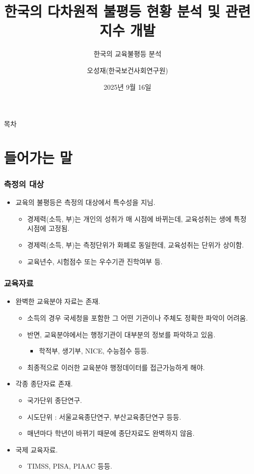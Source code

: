\documentclass[aspectratio=169,xcolor=dvipsnames,handout]{beamer}
\title{한국의 다차원적 불평등 현황 분석 및 관련 지수 개발}
\subtitle{한국의 교육불평등 분석}
\author{오성재(한국보건사회연구원)}
\institute[KIHASA]
    {%
        국회입법조사처
    }
\date{2025년 9월 16일}
\begin{document}

\frame{\titlepage}

\begin{frame}{목차}
    \setcounter{tocdepth}{1}
    \tableofcontents
\end{frame}

\section{들어가는 말}
\begin{frame}[<+->]
\frametitle{측정의 대상}
    \begin{itemize}
        \item 교육의 불평등은 측정의 대상에서 특수성을 지님.
        \begin{itemize}[<+->]
            \item 경제력(소득, 부)는 개인의 성취가 매 시점에 바뀌는데, 교육성취는 생에 특정시점에 고정됨.
            \item 경제력(소득, 부)는 측정단위가 화폐로 동일한데, 교육성취는 단위가 상이함.
            \item 교육년수, 시험점수 또는 우수기관 진학여부 등.
        \end{itemize}
    \end{itemize}
\end{frame}

\begin{frame}[<+->]
\frametitle{교육자료}
    \begin{itemize}
        \item 완벽한 교육분야 자료는 존재.
        \begin{itemize}[<+->]
            \item 소득의 경우 국세청을 포함한 그 어떤 기관이나 주체도 정확한 파악이 어려움.
            \item 반면, 교육분야에서는 행정기관이 대부분의 정보를 파악하고 있음.
                \begin{itemize}[<+->]
                    \item 학적부, 생기부, NICE, 수능점수 등등.
                \end{itemize}
            \item 최종적으로 이러한 교육분야 행정데이터를 접근가능하게 해야.
        \end{itemize}
        \item 각종 종단자료 존재.
        \begin{itemize}[<+->]
            \item 국가단위 종단연구.
            \item 시도단위 : 서울교육종단연구, 부산교육종단연구 등등.
            \item 매년마다 학년이 바뀌기 때문에 종단자료도 완벽하지 않음.
        \end{itemize}
        \item 국제 교육자료.
        \begin{itemize}[<+->]
            \item TIMSS, PISA, PIAAC 등등.
        \end{itemize}
    \end{itemize}
\end{frame}
\end{document}
